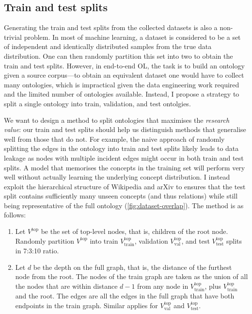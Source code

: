 \subsection{Train and test splits}

Generating the train and test splits from the collected datasets is also a non-trivial problem. In most of machine learning, a dataset is considered to be a set of independent and identically distributed samples from the true data distribution. One can then randomly partition this set into two to obtain the train and test splits. However, in end-to-end OL, the task is to build an ontology given a source corpus---to obtain an equivalent dataset one would have to collect many ontologies, which is impractical given the data engineering work required and the limited number of ontologies available. Instead, I propose a strategy to split a single ontology into train, validation, and test ontolgies.



We want to design a method to split ontologies that maximises the \emph{research value}: our train and test splits should help us distinguish methods that generalise well from those that do not. For example, the naive approach of randomly splitting the edges in the ontology into train and test splits likely leads to data leakage as nodes with multiple incident edges might occur in both train and test splits. A model that memorises the concepts in the training set will perform very well without actually learning the underlying concept distribution. I instead exploit the hierarchical structure of Wikipedia and arXiv to ensures that the test split contains sufficiently many unseen concepts (and thus relations) while still being representative of the full ontology (\cref{fig:dataset-overlap}). The method is as follows:
\begin{enumerate}[leftmargin=*]
    \item Let $V^\text{top}$ be the set of top-level nodes, that is, children of the root node. Randomly partition $V^\text{top}$ into train $V^\text{top}_{\text{train}}$, validation $V^\text{top}_{\text{val}}$, and test $V^\text{top}_{\text{test}}$ splits in 7:3:10 ratio.
    \item Let $d$ be the depth on the full graph, that is, the distance of the furthest node from the root. The nodes of the train graph are taken as the union of all the nodes that are within distance $d - 1$ from any node in $V^\text{top}_\text{train}$, plus $V_\text{train}^\text{top}$ and the root. The edges are all the edges in the full graph that have both endpoints in the train graph. Similar applies for $V^\text{top}_\text{val}$ and $V^\text{top}_\text{test}$.
\end{enumerate}


